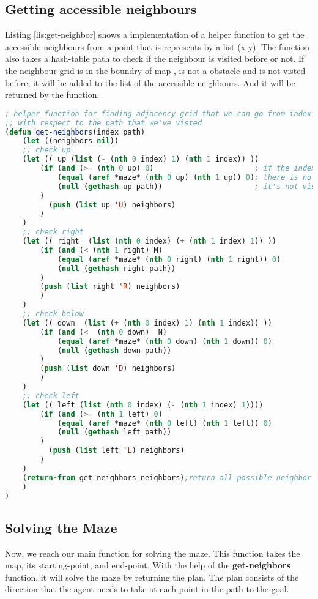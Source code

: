 \subsection{Getting accessible neighbours}
Listing \ref{lis:get-neighbor} shows a implementation of
a helper function to get the accessible neighbours from a
point that is represents by a list (x y). The function also takes
a hash-table path to check if the neighbour is 
visited before or not. If the neighbour grid is in the boundry
of map , is not a obstacle and is not visted before, it will be
added to the list of the accessible neighbours. And it will be 
returned by the function.


\begin{lstlisting}[language=Lisp, style=mystyle,
                 caption=Finding accessible neighbours from a specific point,
                 label=lis:get-neighbor]
; helper function for finding adjacency grid that we can go from index
;; with respect to the path that we've visted
(defun get-neighbors(index path)
    (let ((neighbors nil))
    ;; check up
    (let (( up (list (- (nth 0 index) 1) (nth 1 index)) )) 
        (if (and (>= (nth 0 up) 0)                       ; if the index is in map
            (equal (aref *maze* (nth 0 up) (nth 1 up)) 0); there is no obstacle
            (null (gethash up path))                     ; it's not visited before
        )
          (push (list up 'U) neighbors)
        )
    )
    ;; check right
    (let (( right  (list (nth 0 index) (+ (nth 1 index) 1)) ))
        (if (and (< (nth 1 right) M)
            (equal (aref *maze* (nth 0 right) (nth 1 right)) 0)
            (null (gethash right path))
        )
        (push (list right 'R) neighbors)
        )
    )
    ;; check below
    (let (( down  (list (+ (nth 0 index) 1) (nth 1 index)) ))
        (if (and (<  (nth 0 down)  N)
            (equal (aref *maze* (nth 0 down) (nth 1 down)) 0)
            (null (gethash down path))
        )
        (push (list down 'D) neighbors)
        )
    )
    ;; check left
    (let (( left (list (nth 0 index) (- (nth 1 index) 1)))) 
        (if (and (>= (nth 1 left) 0) 
            (equal (aref *maze* (nth 0 left) (nth 1 left)) 0)
            (null (gethash left path))
        )
          (push (list left 'L) neighbors)
        )
    )
    (return-from get-neighbors neighbors);return all possible neighbor accessible from index
    )
)
\end{lstlisting}

\subsection{Solving the Maze}
Now, we reach our main function for solving 
the maze. This function takes the map, its 
starting-point, and end-point. With the 
help of the \textbf{get-neighbors} function, 
it will solve the maze by returning the plan. 
The plan consists of the direction that the 
agent needs to take at each point in the path 
to the goal.

